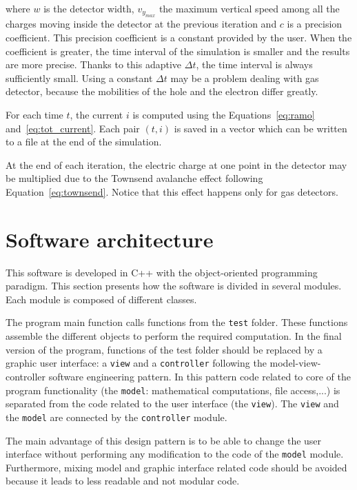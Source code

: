 \documentclass[11pt]{article}
\begin{document}
	where $w$ is the detector width, $v_{y_{max}}$ the maximum vertical speed
	among all the charges moving inside the detector at the previous iteration and
	$c$ is a precision coefficient. This precision coefficient is a constant provided
	by the user. When the coefficient is greater, the time interval
	of the simulation is smaller and the results are more precise.
	Thanks to this adaptive $\Delta t$, the time interval is always sufficiently small.
	Using a constant $\Delta t$ may be a problem dealing with gas detector, because
	the mobilities of the hole and the electron differ greatly.

	For each time $t$, the current $i$ is computed using the Equations~\ref{eq:ramo}
	and~\ref{eq:tot_current}. Each pair $(t, i)$ is saved in a vector which can be
	written to a file at the end of the simulation.

	At the end of each iteration, the electric charge at one point in the detector
	may be multiplied due to the Townsend avalanche effect following Equation~\ref{eq:townsend}.
	Notice that this effect happens only for gas detectors.

\section{Software architecture}

	This software is developed in C++ with the object-oriented programming paradigm.
	This section presents how the software is divided in several modules. Each module
	is composed of different classes.

	The program main function calls functions from the \texttt{test} folder. These functions
	assemble the different objects to perform the required computation. In the
	final version of the program, functions of the test folder should be replaced
	by a graphic user interface: a \texttt{view} and a \texttt{controller} following
	the model-view-controller software engineering pattern. In this pattern code
	related to core of the program functionality (the \texttt{model}: mathematical computations, file access,...)
	is separated from the code related to the user interface (the \texttt{view}).
	The \texttt{view} and the
	\texttt{model} are connected by the \texttt{controller} module.

	The main advantage of this design pattern is to be able to change the user interface without
	performing any modification to the code of the \texttt{model} module. Furthermore,
	mixing model and graphic interface related code should be avoided because it leads to
	less readable and not modular code.
\end{document}
